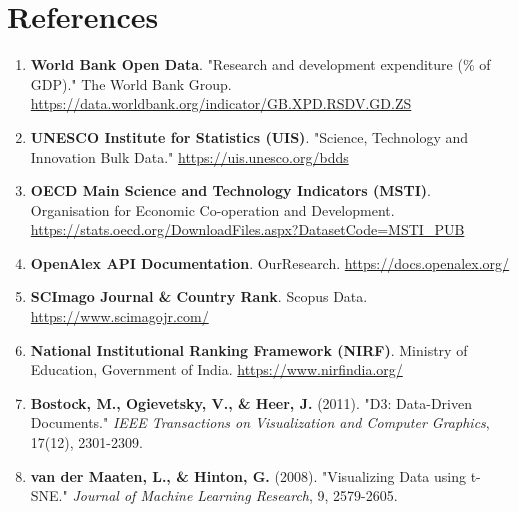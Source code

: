 \documentclass[12pt,a4paper]{article}
\begin{document}
\section{References}
\begin{enumerate}
    \item \textbf{World Bank Open Data}. "Research and development expenditure (\% of GDP)." The World Bank Group. \url{https://data.worldbank.org/indicator/GB.XPD.RSDV.GD.ZS}
    \item \textbf{UNESCO Institute for Statistics (UIS)}. "Science, Technology and Innovation Bulk Data." \url{https://uis.unesco.org/bdds}
    \item \textbf{OECD Main Science and Technology Indicators (MSTI)}. Organisation for Economic Co-operation and Development. \url{https://stats.oecd.org/DownloadFiles.aspx?DatasetCode=MSTI_PUB}
    \item \textbf{OpenAlex API Documentation}. OurResearch. \url{https://docs.openalex.org/}
    \item \textbf{SCImago Journal \& Country Rank}. Scopus Data. \url{https://www.scimagojr.com/}
    \item \textbf{National Institutional Ranking Framework (NIRF)}. Ministry of Education, Government of India. \url{https://www.nirfindia.org/}
    \item \textbf{Bostock, M., Ogievetsky, V., \& Heer, J.} (2011). "D3: Data-Driven Documents." \textit{IEEE Transactions on Visualization and Computer Graphics}, 17(12), 2301-2309.
    \item \textbf{van der Maaten, L., \& Hinton, G.} (2008). "Visualizing Data using t-SNE." \textit{Journal of Machine Learning Research}, 9, 2579-2605.
\end{enumerate}
\end{document}
